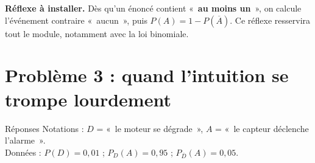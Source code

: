 \documentclass[a4paper,11pt]{article}
\begin{document}
\begin{cle}
\textbf{Réflexe à installer.} Dès qu'un énoncé contient «~\textbf{au moins un}~», on calcule l'événement contraire «~aucun~», puis $P(A) = 1 - P(\overline{A})$. Ce réflexe resservira tout le module, notamment avec la loi binomiale.
\end{cle}

\newpage
\section{Problème 3 : quand l'intuition se trompe lourdement}

\begin{exo}{Réponses}
Notations : $D$ = «~le moteur se dégrade~», $A$ = «~le capteur déclenche l'alarme~». \\
Données : $P(D) = 0{,}01$ \quad ; \quad $P_D(A) = 0{,}95$ \quad ; \quad $P_{\overline{D}}(A) = 0{,}05$.


\end{exo}
\end{document}

